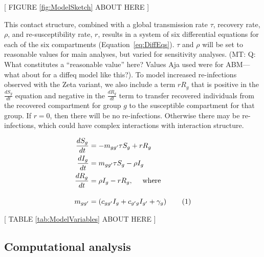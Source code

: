 \documentclass[
  letterpaper,
  abstract]{scrartcl}
\newcommand{\mt}[1]{{\textcolor{myorange} {({\tiny MT:} #1)}}}
\newcommand\numberthis{\addtocounter{equation}{1}\tag{\theequation}}
\begin{document}
\vspace{0.5em}
\begin{center}
{[ FIGURE \ref{fig:ModelSketch} ABOUT HERE ]} \\
\end{center}

This contact structure, combined with a global transmission rate $\tau$,
recovery rate, $\rho$, and re-susceptibility rate, $r$, results in a system of
six differential equations for each of the six compartments
(Equation~\ref{eq:DiffEqs}). $\tau$ and $\rho$ will be set to reasonable values
for main analyses, but varied for sensitivity analyses.  \mt{Q: What constitutes
a ``reasonable value'' here? Values Aja used were for ABM---what about for a
diffeq model like this?}. To model increased re-infections observed with the
Zeta variant, we also include a term $r R_g$ that is positive in the
$\frac{dS_g}{dt}$ equation and negative in the $\frac{dR_g}{dt}$ term to
transfer recovered individuals from the recovered compartment for group $g$ to
the susceptible compartment for that group. If $r=0$, then there will be no
re-infections. Otherwise there may be re-infections, which could have complex
interactions with interaction structure.

\begin{align*}
  \frac{dS_g}{dt} &= -m_{gg'} \tau S_g + r R_g   \\
  \frac{dI_g}{dt} &=  m_{gg'} \tau S_g - \rho I_g \\
  \frac{dR_g}{dt} &= \rho I_g - r R_g,\quad\text{ where } \\[1em]
          m_{gg'} &= \left(c_{gg'} I_g + c_{g'g}I_{g'} + \gamma_g \right)
    \numberthis \label{eq:DiffEqs}
\end{align*}
\noindent


\vspace{0.5em}
\begin{center}
{[ TABLE \ref{tab:ModelVariables} ABOUT HERE ]} \\
\end{center}



\subsection{Computational analysis}
\end{document}
